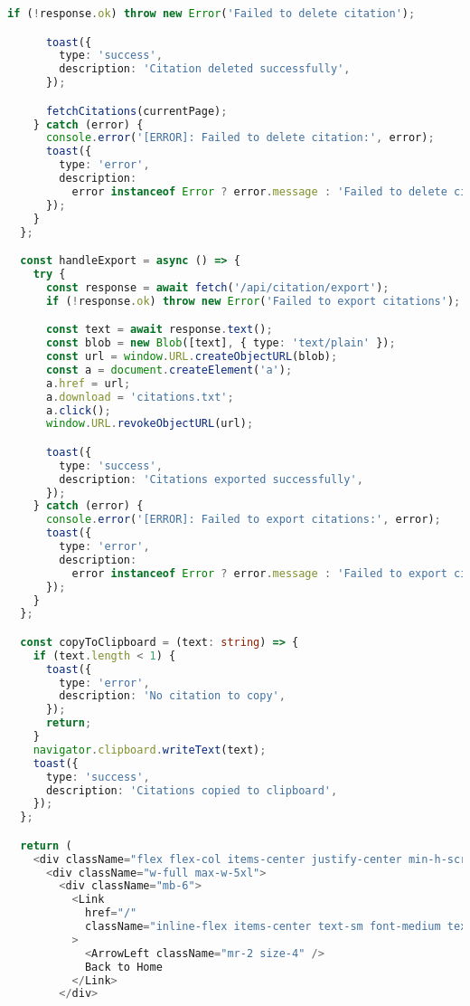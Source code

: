 \begin{lstlisting}[language=TypeScript, caption={Pembuatan Sitasi}, inputencoding=utf8]
      if (!response.ok) throw new Error('Failed to delete citation');

      toast({
        type: 'success',
        description: 'Citation deleted successfully',
      });

      fetchCitations(currentPage);
    } catch (error) {
      console.error('[ERROR]: Failed to delete citation:', error);
      toast({
        type: 'error',
        description:
          error instanceof Error ? error.message : 'Failed to delete citation',
      });
    }
  };

  const handleExport = async () => {
    try {
      const response = await fetch('/api/citation/export');
      if (!response.ok) throw new Error('Failed to export citations');

      const text = await response.text();
      const blob = new Blob([text], { type: 'text/plain' });
      const url = window.URL.createObjectURL(blob);
      const a = document.createElement('a');
      a.href = url;
      a.download = 'citations.txt';
      a.click();
      window.URL.revokeObjectURL(url);

      toast({
        type: 'success',
        description: 'Citations exported successfully',
      });
    } catch (error) {
      console.error('[ERROR]: Failed to export citations:', error);
      toast({
        type: 'error',
        description:
          error instanceof Error ? error.message : 'Failed to export citations',
      });
    }
  };

  const copyToClipboard = (text: string) => {
    if (text.length < 1) {
      toast({
        type: 'error',
        description: 'No citation to copy',
      });
      return;
    }
    navigator.clipboard.writeText(text);
    toast({
      type: 'success',
      description: 'Citations copied to clipboard',
    });
  };

  return (
    <div className="flex flex-col items-center justify-center min-h-screen bg-background p-4">
      <div className="w-full max-w-5xl">
        <div className="mb-6">
          <Link
            href="/"
            className="inline-flex items-center text-sm font-medium text-primary hover:underline"
          >
            <ArrowLeft className="mr-2 size-4" />
            Back to Home
          </Link>
        </div>


\end{lstlisting}
